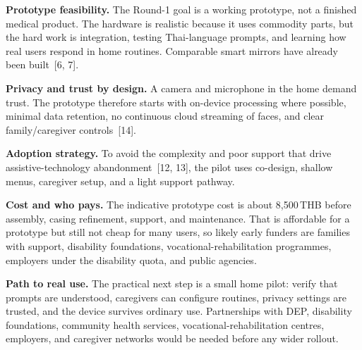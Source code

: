   \item {}

    \textbf{Prototype feasibility.} The Round-1 goal is a working prototype, not a
    finished medical product. The hardware is realistic because it uses commodity parts,
    but the hard work is integration, testing Thai-language prompts, and learning how
    real users respond in home routines. Comparable smart mirrors have already been
    built~[6, 7].

    \textbf{Privacy and trust by design.} A camera and microphone in the home demand
    trust. The prototype therefore starts with on-device processing where possible,
    minimal data retention, no continuous cloud streaming of faces, and clear
    family/caregiver controls~[14].

    \textbf{Adoption strategy.} To avoid the complexity and poor support that drive
    assistive-technology abandonment~[12, 13], the pilot uses co-design, shallow
    menus, caregiver setup, and a light support pathway.

    \textbf{Cost and who pays.} The indicative prototype cost is about 8{,}500\,THB
    before assembly, casing refinement, support, and maintenance. That is affordable
    for a prototype but still not cheap for many users, so likely early funders are
    families with support, disability foundations, vocational-rehabilitation programmes,
    employers under the disability quota, and public agencies.

    \textbf{Path to real use.} The practical next step is a small home pilot: verify
    that prompts are understood, caregivers can configure routines, privacy settings are
    trusted, and the device survives ordinary use. Partnerships with DEP, disability
    foundations, community health services, vocational-rehabilitation centres, employers,
    and caregiver networks would be needed before any wider rollout.
